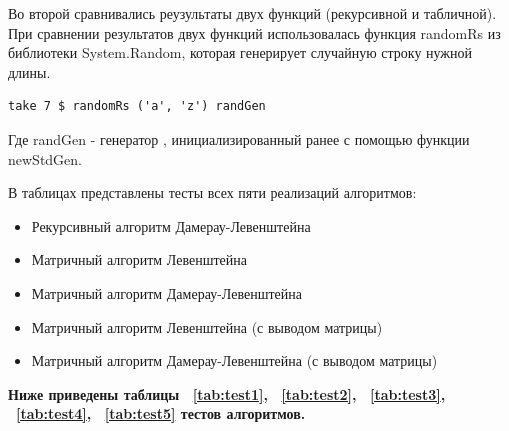 \documentclass[12pt]{report}
\begin{document}
    Во второй сравнивались реузультаты двух функций (рекурсивной и табличной).
    При сравнении результатов двух функций использовалась функция randomRs из библиотеки System.Random, которая генерирует случайную строку нужной длины.
    
    \begin{lstlisting}[label=randStr,caption=Функция генерации случайной строки длины 7]
    take 7 $ randomRs ('a', 'z') randGen
    \end{lstlisting}
    Где randGen - генератор , инициализированный ранее с помощью функции newStdGen.
    
    В таблицах представлены тесты всех пяти реализаций алгоритмов:
    \begin{itemize}
    	\item Рекурсивный алгоритм Дамерау-Левенштейна
    	\item Матричный алгоритм Левенштейна
    	\item Матричный алгоритм Дамерау-Левенштейна
    	\item Матричный алгоритм Левенштейна (с выводом матрицы)
    	\item Матричный алгоритм Дамерау-Левенштейна (с выводом матрицы)
    \end{itemize}

	{\bf Ниже приведены таблицы ~\ref{tab:test1}, ~\ref{tab:test2}, ~\ref{tab:test3}, ~\ref{tab:test4}, ~\ref{tab:test5} тестов алгоритмов.}
\end{document}
